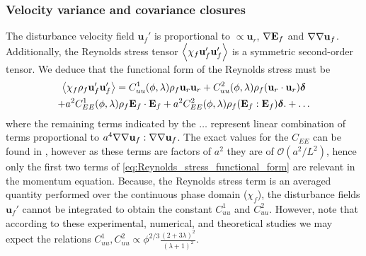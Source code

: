 \subsubsection{Velocity variance and covariance closures}


The disturbance velocity field $\textbf{u}_f'$ is proportional to $\propto \textbf{u}_r$, $\mathbf{\nabla}\textbf{E}_f$ and $\mathbf{\nabla}\mathbf{\nabla} \textbf{u}_f$.
Additionally, the Reynolds stress tensor $\left<\chi_f \textbf{u}_f'\textbf{u}_f'\right>$ is a symmetric second-order tensor. 
We deduce that the functional form of the Reynolds stress must be 
\begin{multline}
    \avg{\chi_f \rho_f \textbf{u}_f' \textbf{u}_f'}
    =
    C_{uu}^1(\phi,\lambda) \rho_f \textbf{u}_{r} \textbf{u}_{r}
    + C_{uu}^2(\phi,\lambda) \rho_f (\textbf{u}_{r}\cdot  \textbf{u}_{r})\bm\delta\\
    +a^2 C_{EE}^1(\phi,\lambda) \rho_f\textbf{E}_f\cdot \textbf{E}_f 
    +  a^2 C_{EE}^2(\phi,\lambda) \rho_f (\textbf{E}_f : \textbf{E}_f)\bm\delta.
    + \ldots
    \label{eq:Reynolds_stress_functional_form}
\end{multline}
where the remaining terms indicated by the $\ldots$ represent linear combination of terms proportional to $a^4\mathbf{\nabla}\mathbf{\nabla} \textbf{u}_f:\mathbf{\nabla}\mathbf{\nabla} \textbf{u}_f$. 
The exact values for the $C_{EE}$ can be found in \citet{raja2010inertial}, however as these terms are factors of $a^2$ they are of $\mathcal{O}(a^2/L^2)$, hence only the first two terms of \ref{eq:Reynolds_stress_functional_form} are relevant in the momentum equation. 
Because, the Reynolds stress term is an averaged quantity performed over the continuous phase domain ($\chi_f$), the disturbance fields $\textbf{u}_f'$ cannot be integrated to obtain the constant $C_{uu}^1$ and $C_{uu}^2$. 
However, note that according to these experimental\citep{cartellier2009induced}, numerical, and theoretical\citep{hill2001first} studies we may expect the relations $C_{uu}^1,C_{uu}^2 \propto \phi^{2/3} \frac{(2+3\lambda)^2}{(\lambda+1)^2}$. 


